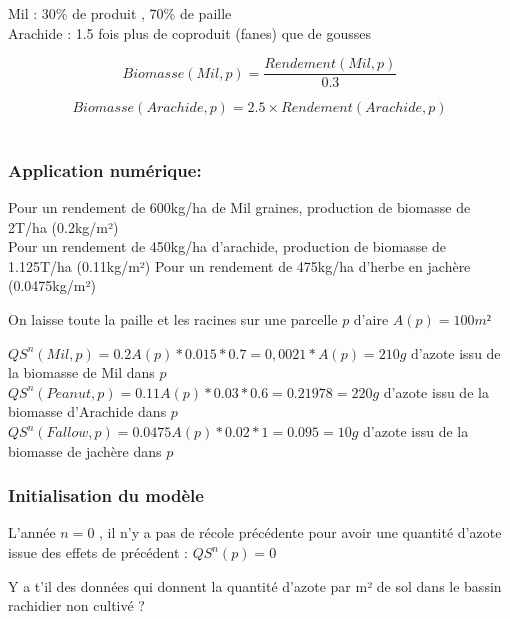 \documentclass[10pt,a4paper,french]{article} %
\begin{document}
Mil : 30\% de produit ,  70\% de paille \\
Arachide : 1.5 fois plus de coproduit (fanes) que de gousses

\begin{equation}
Biomasse(Mil,p) =  \frac{Rendement(Mil,p)}{0.3}
\end{equation}

\begin{equation}
Biomasse(Arachide,p) =  2.5 \times Rendement(Arachide,p)
\end{equation}\\


\subsubsection{Application numérique:} 

Pour un rendement de 600kg/ha de Mil graines, production de biomasse de 2T/ha (0.2kg/m²)\\
Pour un rendement de 450kg/ha d'arachide, production de biomasse de 1.125T/ha (0.11kg/m²)
Pour un rendement de 475kg/ha d'herbe en jachère (0.0475kg/m²) 



On laisse toute la paille et les racines sur une parcelle $p$ d'aire $A(p)=100m²$


$QS^{n}(Mil, p)= 0.2 A(p)* 0.015 * 0.7 = 0,0021* A(p)= 210g$ d'azote issu de la biomasse de Mil dans $p$ \\
$QS^{n}(Peanut, p)= 0.11 A(p) * 0.03 * 0.6 = 0.21978 = 220g$ d'azote issu de la biomasse d'Arachide  dans $p$\\
$QS^{n}(Fallow, p)= 0.0475 A(p)* 0.02 * 1 = 0.095 = 10g$ d'azote issu de la biomasse de jachère  dans $p$ \\




\subsubsection{Initialisation du modèle}


L'année $n=0$ , il n'y a pas de récole précédente pour  avoir une quantité d'azote issue des effets de précédent : $QS^n(p)=0$


\begin{tcolorbox}[noparskip,
    colback=LightGreen,colframe=DarkGreen,%
    colbacklower=LimeGreen!75!LightGreen,%
    title=Question]

Y a t'il des données qui donnent la quantité d'azote par m² de sol dans le bassin rachidier non cultivé ?
\end{tcolorbox}
\end{document}
